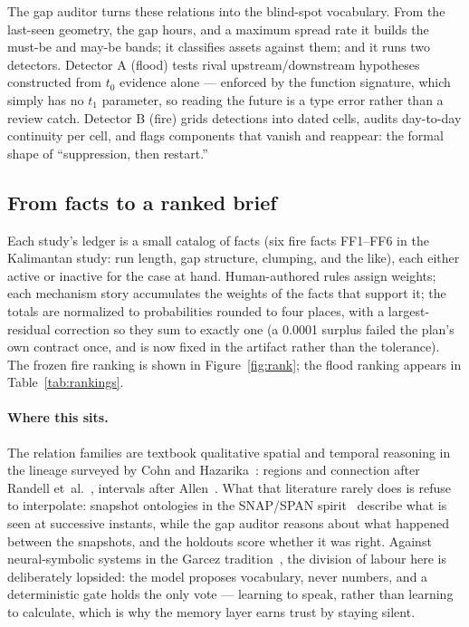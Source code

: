 \documentclass[11pt]{article}
\begin{document}
The gap auditor turns these relations into the blind-spot vocabulary. From
the last-seen geometry, the gap hours, and a maximum spread rate it builds
the must-be and may-be bands; it classifies assets against them; and it runs
two detectors. Detector A (flood) tests rival upstream/downstream hypotheses
constructed from $t_0$ evidence alone --- enforced by the function signature,
which simply has no $t_1$ parameter, so reading the future is a type error
rather than a review catch. Detector B (fire) grids detections into dated
cells, audits day-to-day continuity per cell, and flags components that
vanish and reappear: the formal shape of ``suppression, then restart.''

\subsection{From facts to a ranked brief}

Each study's ledger is a small catalog of facts (six fire facts FF1--FF6 in
the Kalimantan study: run length, gap structure, clumping, and the like),
each either active or inactive for the case at hand. Human-authored rules
assign weights; each mechanism story accumulates the weights of the facts
that support it; the totals are normalized to probabilities rounded to four
places, with a largest-residual correction so they sum to exactly one (a
0.0001 surplus failed the plan's own contract once, and is now fixed in the
artifact rather than the tolerance). The frozen fire ranking is shown in
Figure~\ref{fig:rank}; the flood ranking appears in Table~\ref{tab:rankings}.

\paragraph{Where this sits.} The relation families are textbook qualitative
spatial and temporal reasoning in the lineage surveyed by Cohn and
Hazarika~\cite{cohn2001}: regions and connection after Randell
et~al.~\cite{randell1992}, intervals after Allen~\cite{allen1983}. What that
literature rarely does is refuse to interpolate: snapshot ontologies in the
SNAP/SPAN spirit~\cite{grenon2004} describe what is seen at successive instants,
while the gap auditor reasons about what happened between the snapshots, and
the holdouts score whether it was right. Against neural-symbolic systems in the
Garcez tradition~\cite{garcez2002}, the division of labour here is deliberately
lopsided: the model proposes vocabulary, never numbers, and a deterministic
gate holds the only vote --- learning to speak, rather than learning to
calculate, which is why the memory layer earns trust by staying silent.
\end{document}

